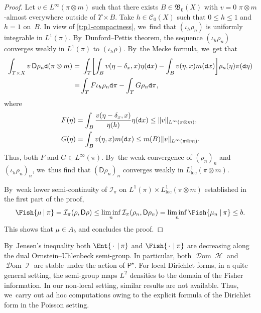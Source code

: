 \documentclass[10pt]{amsart}
\theoremstyle{definition}
\theoremstyle{remark}
\DeclarePairedDelimiter{\bracket}{\lbrack}{\rbrack}
\DeclarePairedDelimiter{\norm}{\lVert}{\rVert}
\newcommand{\given}[1][]{%
\nonscript\:#1\vert
\allowbreak
\nonscript\:
\mathopen{}}
\DeclareMathOperator{\ent}{\mathcal{H}}
\DeclareMathOperator{\fish}{\mathcal{I}}
\DeclareMathOperator{\dom}{\mathscr{D}om}
\newcommand{\emparg}{\,\cdot\,}
\begin{document}
\begin{proof}
Let $v \in L^{\infty}(\pi \otimes m)$ such that there exists $B \in \mathfrak{B}_{0}(X)$ with $v = 0$ $\pi \otimes m$-almost everywhere outside of $\varUpsilon \times B$.
Take $h \in \mathscr{C}_{0}(X)$ such that $0 \leq h \leq 1$ and $h = 1$ on~$B$.
In view of \cref{t:p1-compactness}, we~find that $(\iota_{h} \rho_{n})$ is uniformly integrable in $L^{1}(\pi)$.
By~Dunford--Pettis theorem, the sequence $(\iota_{h} \rho_{n})$ converges weakly in $L^{1}(\pi)$ to $(\iota_{h}\rho)$.
By~the Mecke formula, we~get that
\begin{equation*}
\begin{split}
\int_{\varUpsilon \times X} v\, \mathsf{D} \rho_{n} \mathtt{d} (\pi \otimes m) =&\ \int_{\varUpsilon} \bracket*{ \int_{B} v(\eta - \delta_{x}, x) \eta(\mathtt{d} x) - \int_{B} v(\eta, x) m(\mathtt{d} x) } \rho_{n}(\eta) \pi(\mathtt{d} \eta)
\\
=& \int_{\varUpsilon} F \iota_{h} \rho_{n} \mathtt{d} \pi - \int_{\varUpsilon} G \rho_{n} \mathtt{d} \pi,
\end{split}
\end{equation*}
where
\begin{align*}
& F(\eta) = \int_{B} \frac{v(\eta - \delta_{x}, x)}{\eta(h)} \eta(\mathtt{d} x) \leq \norm{v}_{L^{\infty}(\pi \otimes m)}, \\
& G(\eta) = \int_{B} v(\eta, x) m(\mathtt{d} x) \leq m(B) \norm{v}_{L^{\infty}(\pi \otimes m)}.
\end{align*}
Thus, both $F$ and $G \in L^{\infty}(\pi)$.
By~the weak convergence of $(\rho_{n})_n$ and $(\iota_{h} \rho_{n})_n$, we~thus find that $(\mathsf{D} \rho_{n})_n$ converges weakly in $L^{1}_{\mathrm{loc}}(\pi \otimes m)$.

By~weak lower semi-continuity of $\mathcal{I}_{\pi}$ on $L^{1}(\pi) \times L_{\mathrm{loc}}^{1}(\pi \otimes m)$ established in the first part of the proof,
\begin{equation*}
\Fish{\mu \given \pi} = \mathcal{I}_{\pi}(\rho, \mathsf{D} \rho) \leq \liminf_n \mathcal{I}_{\pi}(\rho_{n}, \mathsf{D} \rho_{n}) = \liminf_n \Fish{ \mu_{n} \given \pi } \leq b.
\end{equation*}
This shows that $\mu \in A_b$ and concludes the proof.
\end{proof}

By~Jensen's inequality both $\Ent{\emparg \given \pi}$ and $\Fish{\emparg \given \pi}$ are decreasing along the dual Ornstein--Uhlenbeck semi-group.
In particular, both $\dom \ent$ and $\dom \fish$ are stable under the action of $\mathsf{P}^{\star}$.
For local Dirichlet forms, in a quite general setting, the semi-group maps $L^{2}$ densities to the domain of the Fisher information.
In our non-local setting, similar results are not available.
Thus, we~carry out ad hoc computations owing to the explicit formula of the Dirichlet form in the Poisson setting.
\end{document}
